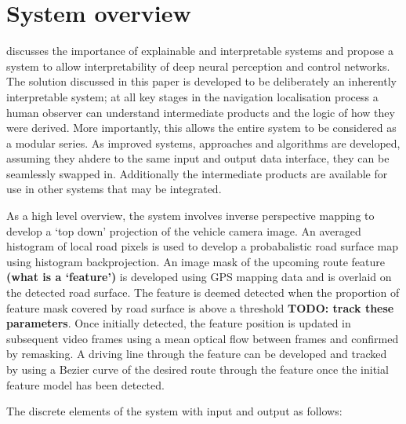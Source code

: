 \documentclass[]{aiaa-tc}%
\begin{document}
\section{System overview}
\citep{explainableCNNBookChapter} discusses the importance of explainable and interpretable systems and propose a system to allow interpretability of deep neural perception and control networks. The solution discussed in this paper is developed to be deliberately an inherently interpretable system; at all key stages in the navigation localisation process a human observer can understand intermediate products and the logic of how they were derived. 
More importantly, this allows the entire system to be considered as a modular series. As improved systems, approaches and algorithms are developed, assuming they ahdere to the same input and output data interface, they can be seamlessly swapped in. Additionally the intermediate products are available for use in other systems that may be integrated.

As a high level overview, the system involves inverse perspective mapping to develop a `top down' projection of the vehicle camera image. An averaged histogram of local road pixels is used to develop a probabalistic road surface map using histogram backprojection. An image mask of the upcoming route feature \textbf{(what is a `feature')} is developed using GPS mapping data and is overlaid on the detected road surface. The feature is deemed detected when the proportion of feature mask covered by road surface is above a threshold \textbf{TODO: track these parameters}. Once initially detected, the feature position is updated in subsequent video frames using a mean optical flow between frames and confirmed by remasking. A driving line through the feature can be developed and tracked by using a Bezier curve of the desired route through the feature once the initial feature model has been detected.

The discrete elements of the system with input and output as follows:
\end{document}
